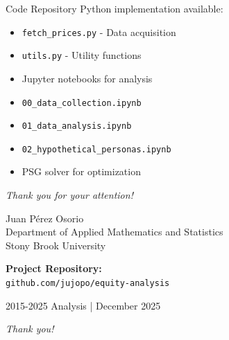 \documentclass[12pt, aspectratio=43]{beamer}
\begin{document}
	\begin{frame}
		\begin{block}{Code Repository}
			Python implementation available:
			\begin{itemize}
				\item \texttt{fetch\_prices.py} - Data acquisition
				\item \texttt{utils.py} - Utility functions
				\item Jupyter notebooks for analysis
				\item \texttt{00\_data\_collection.ipynb}
				\item \texttt{01\_data\_analysis.ipynb}
				\item \texttt{02\_hypothetical\_personas.ipynb}
				\item PSG solver for optimization
			\end{itemize}
		\end{block}
		
		\vspace{1em}
		
		\centering
		\color{darkgray}\textit{Thank you for your attention!}
	\end{frame}
	
	
	\begin{frame}
		\centering
		\vspace{3em}
		
		\color{darkorange}{\LARGE Questions?}
		
		\vspace{2em}
		
		\small
		Juan Pérez Osorio \\
		\footnotesize
		Department of Applied Mathematics and Statistics \\
		Stony Brook University
		
		\vspace{1.5em}
		
		\textbf{Project Repository:} \\
		\texttt{github.com/jujopo/equity-analysis}
		
		\vspace{0.5em}
		
		\footnotesize
		2015-2025 Analysis | December 2025
		
		\vspace{2em}
		
		\textit{Thank you!}
	\end{frame}
	
\end{document}
